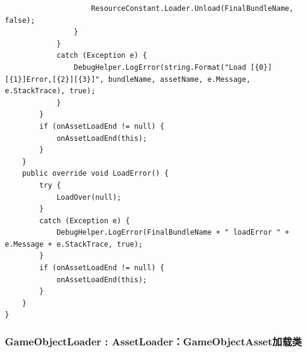 \documentclass[9pt, b5paper]{article}
\begin{document}
\begin{itemize}
\begin{verbatim}
                    ResourceConstant.Loader.Unload(FinalBundleName, false);
                }
            }
            catch (Exception e) {
                DebugHelper.LogError(string.Format("Load [{0}][{1}]Error,[{2}][{3}]", bundleName, assetName, e.Message, e.StackTrace), true);
            }
        }
        if (onAssetLoadEnd != null) {
            onAssetLoadEnd(this);
        }
    }
    public override void LoadError() {
        try {
            LoadOver(null);
        }
        catch (Exception e) {
            DebugHelper.LogError(FinalBundleName + " loadError " + e.Message + e.StackTrace, true);
        }
        if (onAssetLoadEnd != null) {
            onAssetLoadEnd(this);
        }
    }
}
\end{verbatim}
\end{itemize}
\subsubsection{GameObjectLoader : AssetLoader：GameObjectAsset加载类}
\label{sec-7-1-2}
\end{document}
